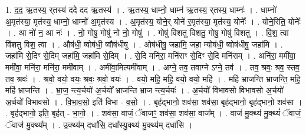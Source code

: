 \documentclass[17pt]{extarticle}
\begin{document}
1. द॒द॒ ऋ॒तस्य॒ र्‌तस्य॑ ददे दद ऋ॒तस्य॑ । . ऋ॒तस्य॒ धाम्नो॒ धाम्न॑ ऋ॒तस्य॒ र्‌तस्य॒ धाम्नः॑ । . धाम्नो॑ अ॒मृत॑स्या॒ मृत॑स्य॒ धाम्नो॒ धाम्नो॑ अ॒मृत॑स्य । . अ॒मृत॑स्य॒ योने॒र् योने॑ र॒मृत॑स्या॒ मृत॑स्य॒ योनेः᳚ । . योने॒रिति॒ योनेः᳚ । . आ नो॑ न॒ आ नः॑ । . नो॒ गोषु॒ गोषु॑ नो नो॒ गोषु॑ । . गोषु॑ विशतु विशतु॒ गोषु॒ गोषु॑ विशतु । . वि॒श॒ त्वा वि॑शतु विश॒ त्वा । . औष॑धी॒ ष्वोष॑धी॒ ष्वौष॑धीषु । . ओष॑धीषु॒ जहा॑मि॒ जहा॒ म्योष॑धी॒ ष्वोष॑धीषु॒ जहा॑मि । . जहा॑मि से॒दिꣳ से॒दिम् जहा॑मि॒ जहा॑मि से॒दिम् । . से॒दि मनि॑रा॒ मनि॑राꣳ से॒दिꣳ से॒दि मनि॑राम् । . अनि॑रा॒ ममी॑वा॒ ममी॑वा॒ मनि॑रा॒ मनि॑रा॒ ममी॑वाम् । . अमी॑वा॒मित्यमी॑वाम् । . अग्ने॒ तव॒ तवाग्ने ऽग्ने॒ तव॑ । . तव॒ श्रवः॒ श्रव॒ स्तव॒ तव॒ श्रवः॑ । . श्रवो॒ वयो॒ वयः॒ श्रवः॒ श्रवो॒ वयः॑ । . वयो॒ महि॒ महि॒ वयो॒ वयो॒ महि॑ । . महि॑ भ्राजन्ति भ्राजन्ति॒ महि॒ महि॑ भ्राजन्ति । . भ्रा॒ज॒ न्त्य॒र्चयो॑ अ॒र्चयो᳚ भ्राजन्ति भ्राज न्त्य॒र्चयः॑ । . अ॒र्चयो॑ विभावसो विभावसो अ॒र्चयो॑ अ॒र्चयो॑ विभावसो । . वि॒भा॒व॒सो॒ इति॑ विभा - व॒सो॒ । . बृह॑द्भानो॒ शव॑सा॒ शव॑सा॒ बृह॑द्भानो॒ बृह॑द्भानो॒ शव॑सा । . बृह॑द्भानो॒ इति॒ बृह॑त् - भा॒नो॒ । . शव॑सा॒ वाजं॒ ॅवाजꣳ॒॒ शव॑सा॒ शव॑सा॒ वाज᳚म् । . वाज॑ मु॒क्थ्य॑ मु॒क्थ्यं॑ ॅवाजं॒ ॅवाज॑ मु॒क्थ्य᳚म् । . उ॒क्थ्य॑म् दधा॑सि॒ दधा᳚स्यु॒क्थ्य॑ मु॒क्थ्य॑म् दधा॑सि । \newline
\end{document}
